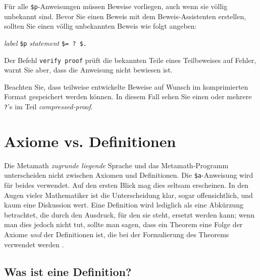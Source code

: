 Für alle \texttt{\$p}-Anweisungen müssen Beweise vorliegen, auch wenn sie völlig unbekannt sind.  Bevor Sie einen Beweis mit dem Beweis-Assistenten erstellen, sollten Sie einen völlig unbekannten Beweis wie folgt angeben:
\begin{center}
  {\em label} \texttt{\$p} {\em statement} \texttt{\$= ?\ \$.}
\end{center}
\index{\texttt{]}@\texttt{?}\ innerhalb von Beweisen}

Der Befehl \texttt{verify proof} prüft die bekannten Teile eines Teilbeweises auf Fehler, warnt Sie aber, dass die Anweisung nicht bewiesen ist.

Beachten Sie, dass teilweise entwickelte Beweise auf Wunsch im komprimierten Format gespeichert werden können.  In diesem Fall sehen Sie einen oder mehrere \texttt{?}'s im Teil {\em compressed-proof}.

\section{Axiome vs. Definitionen}\label{definitions}

Die Metamath \textit{zugrunde liegende} Sprache und das Metamath-Programm unterscheiden nicht zwischen Axiomen und Definitionen. Die \texttt{\$a}-Anweisung wird für beides verwendet.  Auf den ersten Blick mag dies seltsam erscheinen.  In den Augen vieler Mathematiker ist die Unterscheidung klar, sogar offensichtlich, und kaum eine Diskussion wert.  Eine Definition wird lediglich als eine Abkürzung betrachtet, die durch den Ausdruck, für den sie steht, ersetzt werden kann; wenn man dies jedoch nicht tut, sollte man sagen, dass ein Theorem eine Folge der Axiome {\em und} der Definitionen ist, die bei der Formulierung des Theorems verwendet werden \cite[S.~20]{Behnke}.

\subsection{Was ist eine Definition?}

